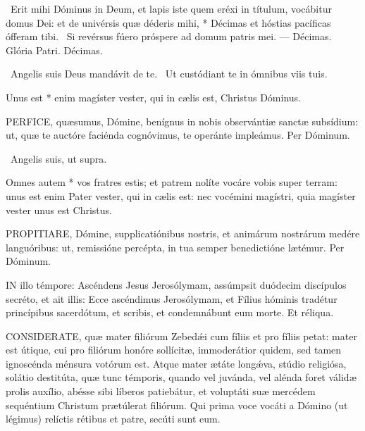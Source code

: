 \R\ Erit mihi Dóminus in Deum, et lapis iste quem eréxi in títulum, vocábitur domus Dei: et de univérsis quæ déderis mihi, * Décimas et hóstias pacíficas ófferam tibi. \V\ Si revérsus fúero próspere ad domum patris mei. --- Décimas. Glória Patri. Décimas.

\V\ Angelis suis Deus mandávit de te. \R\ Ut custódiant te in ómnibus viis tuis.

 Unus est * enim magíster vester, qui in cælis est, Christus Dóminus.


\lettrine[lines=2]{P}{ERFICE}, quæsumus, Dómine, benígnus in nobis observántiæ sanctæ subsídium: ut, quæ te auctóre faciénda cognóvimus, te operánte impleámus. Per Dóminum.

\V\ Angelis suis, ut supra.

 Omnes autem * vos fratres estis; et patrem nolíte vocáre vobis super terram: unus est enim Pater vester, qui in cælis est: nec vocémini magístri, quia magíster vester unus est Christus.


\lettrine[lines=2]{P}{ROPITIARE}, Dómine, supplicatiónibus nostris, et animárum nostrárum medére languóribus: ut, remissióne percépta, in tua semper benedictióne lætémur. Per Dóminum.

\sectionornament




\lettrine[lines=2]{I}{N} illo témpore: Ascéndens Jesus Jerosólymam, assúmpsit duódecim discípulos secréto, et ait illis: Ecce ascéndimus Jerosólymam, et Fílius hóminis tradétur princípibus sacerdótum, et scribis, et condemnábunt eum morte. Et réliqua.



\lettrine[lines=2]{C}{ONSIDERATE}, quæ mater filiórum Zebedǽi cum fíliis et pro fíliis petat: mater est útique, cui pro filiórum honóre sollícitæ, immoderátior quidem, sed tamen ignoscénda ménsura votórum est. Atque mater ætáte longǽva, stúdio religiósa, solátio destitúta, quæ tunc témporis, quando vel juvánda, vel alénda foret válidæ prolis auxílio, abésse sibi líberos patiebátur, et voluptáti suæ mercédem sequéntium Christum prætúlerat filiórum. Qui prima voce vocáti a Dómino (ut légimus) relíctis rétibus et patre, secúti sunt eum.

